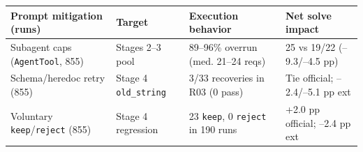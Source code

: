 \begin{tabular}{llll}
\toprule
Prompt mitigation (runs) & Target & Execution behavior & Net solve impact \\
\midrule
Subagent caps (\texttt{AgentTool}, 855) & Stages 2--3 pool & 89--96\% overrun (med. 21--24 reqs) & 25 vs 19/22 (--9.3/--4.5 pp) \\
Schema/heredoc retry (855) & Stage 4 \texttt{old\_string} & 3/33 recoveries in R03 (0 pass) & Tie official; --2.4/--5.1 pp ext \\
Voluntary \texttt{keep}/\texttt{reject} (855) & Stage 4 regression & 23 \texttt{keep}, 0 \texttt{reject} in 190 runs & +2.0 pp official; --2.4 pp ext \\
\bottomrule
\end{tabular}
